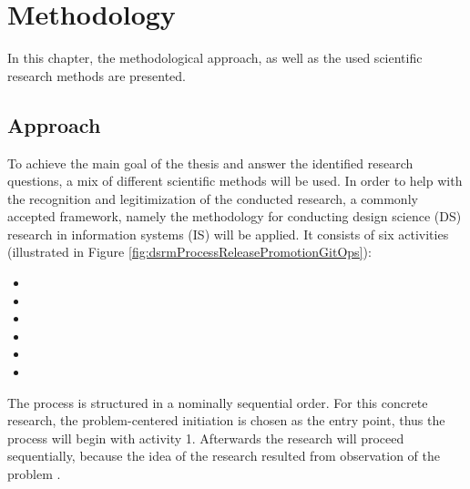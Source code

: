 \chapter{Methodology}

In this chapter,
the methodological approach,
as well as
the used scientific research methods
are presented.


\section{Approach}
\label{methodology:approach}

To achieve the main goal of the thesis and answer the identified research questions,
a mix of different scientific methods will be used.
In order to help with the recognition and legitimization of the conducted research,
a commonly accepted framework, namely
the methodology for conducting design science (DS) research
in information systems (IS)
\autocite{designScienceResearchMethodologyForInformationSystemsResearch}
will be applied.
It consists of six activities
(illustrated in Figure \ref{fig:dsrmProcessReleasePromotionGitOps}):

\begin{itemize}
	\item {}
	\item {}
	\item {}
	\item {}
	\item {}
	\item {}
\end{itemize}

The process is structured in a nominally sequential order.
For this concrete research,
the problem-centered initiation is chosen as the entry point,
thus the process will begin with activity 1.
Afterwards the research will proceed sequentially,
because the idea of the research resulted from observation of the problem
\autocite{designScienceResearchMethodologyForInformationSystemsResearch}.
\bigskip


